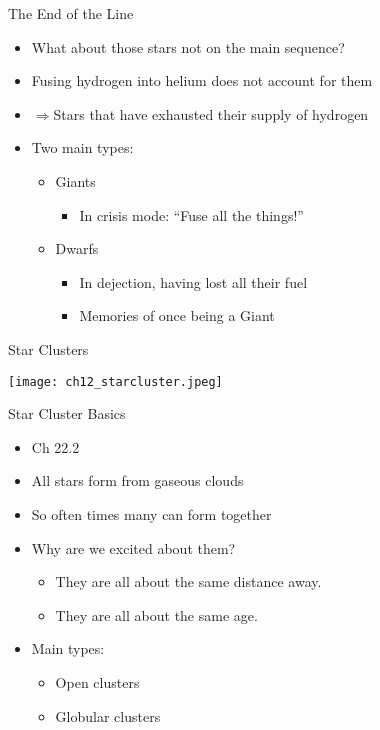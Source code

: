 \documentclass[pdf, aspectratio=169]{beamer}
\begin{document}
\begin{frame}{The End of the Line}
  \begin{itemize}
	\item What about those stars not on the main sequence?
	\item Fusing hydrogen into helium does not account for them
	\item $\Rightarrow$Stars that have exhausted their supply of hydrogen
	\item Two main types:
	  \begin{itemize}
		\item Giants
		  \begin{itemize}
			\item In crisis mode: ``Fuse all the things!''
		  \end{itemize}
		\item Dwarfs
		  \begin{itemize}
			\item In dejection, having lost all their fuel
			\item Memories of once being a Giant
		  \end{itemize}
	  \end{itemize}
  \end{itemize}
\end{frame}

\begin{frame}{Star Clusters}
  \begin{center}
	\texttt{[image: ch12\_starcluster.jpeg]}
  \end{center}
\end{frame}

\begin{frame}{Star Cluster Basics}
  \begin{itemize}
	  \item Ch 22.2
	\item All stars form from gaseous clouds
	\item So often times many can form together
	\item Why are we excited about them?
	  \begin{itemize}
		\item They are all about the same distance away.
		\item They are all about the same age.
	  \end{itemize}
	\item Main types:
	  \begin{itemize}
		\item Open clusters
		\item Globular clusters
	  \end{itemize}
  \end{itemize}
\end{frame}
\end{document}
